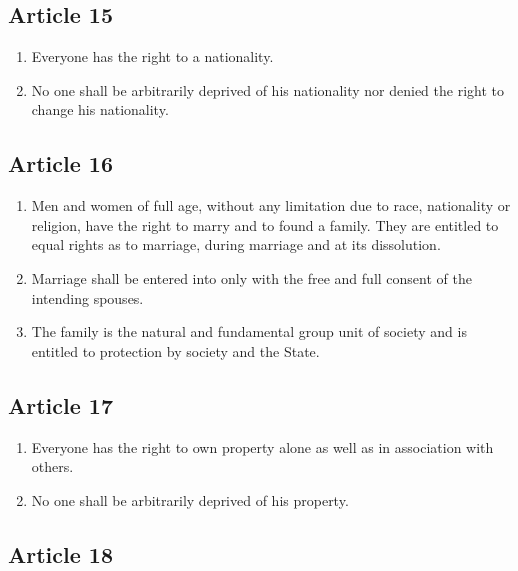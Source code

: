 \documentclass[
  titlepage,
  openright,
  DIV=calc,
  toc=listof,
  listof=nochaptergap]{scrbook}
\begin{document}
\subsection{Article 15}\label{article-15}

\begin{enumerate}
\def\labelenumi{\arabic{enumi}.}
\item
  Everyone has the right to a nationality.
\item
  No one shall be arbitrarily deprived of his nationality nor denied the
  right to change his nationality.
\end{enumerate}

\subsection{Article 16}\label{article-16}

\begin{enumerate}
\def\labelenumi{\arabic{enumi}.}
\item
  Men and women of full age, without any limitation due to race,
  nationality or religion, have the right to marry and to found a
  family. They are entitled to equal rights as to marriage, during
  marriage and at its dissolution.
\item
  Marriage shall be entered into only with the free and full consent of
  the intending spouses.
\item
  The family is the natural and fundamental group unit of society and is
  entitled to protection by society and the State.
\end{enumerate}

\subsection{Article 17}\label{article-17}

\begin{enumerate}
\def\labelenumi{\arabic{enumi}.}
\item
  Everyone has the right to own property alone as well as in association
  with others.
\item
  No one shall be arbitrarily deprived of his property.
\end{enumerate}

\subsection{Article 18}\label{article-18}
\end{document}
